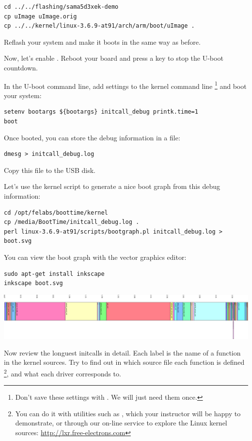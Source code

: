 \begin{verbatim}
cd ../../flashing/sama5d3xek-demo
cp uImage uImage.orig
cp ../../kernel/linux-3.6.9-at91/arch/arm/boot/uImage .
\end{verbatim}

Reflash your system and make it boots in the same way as before.

Now, let's enable . Reboot your board and press
a key to stop the U-boot countdown.

In the U-boot command line, add settings to the kernel command line
\footnote{Don't save these settings with . We
will just need them once.}
and boot your system:
\begin{verbatim}
setenv bootargs ${bootargs} initcall_debug printk.time=1
boot
\end{verbatim}

Once booted, you can store the debug information in a file:

\begin{verbatim}
dmesg > initcall_debug.log
\end{verbatim}

Copy this file to the USB disk.

Let's use the kernel script to generate a nice boot graph
from this debug information:

\begin{verbatim}
cd /opt/felabs/boottime/kernel
cp /media/BootTime/initcall_debug.log .
perl linux-3.6.9-at91/scripts/bootgraph.pl initcall_debug.log > boot.svg
\end{verbatim}

You can view the boot graph with the  vector graphics
editor:

\begin{verbatim}
sudo apt-get install inkscape
inkscape boot.svg
\end{verbatim}

\begin{center}
\includegraphics[width=\textwidth]{labs/boottime-kernel/boot.png}
\end{center}

Now review the longuest initcalls in detail. Each label is the name of
a function in the kernel sources. Try to find out in which source file
each function is defined
\footnote{You can do it with utilities such as , which your
instructor will be happy to demonstrate, or through our on-line service
to explore the Linux kernel sources:
\url{http://lxr.free-electrons.com}}, and what each driver corresponds
to.


